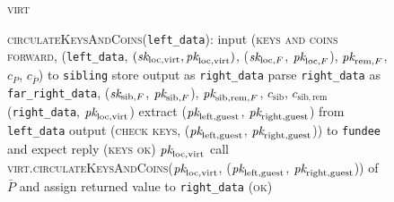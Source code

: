 \begin{figure}[H]
\begin{processbox}{\textsc{virt}}
\begin{algorithmic}[1]
      \State \textsc{circulateKeysAndCoins}(\texttt{left\_data}):
      \Indent
         
           
            \State input (\textsc{keys and coins forward}, (\texttt{left\_data},
            $(\textit{sk}_{\mathrm{loc}, \mathrm{virt}}, \textit{pk}_{\mathrm{loc},
            \mathrm{virt}})$, ($\textit{sk}_{\mathrm{loc}, F}$, $\textit{pk}_{\mathrm{loc}, F}$),
            $\textit{pk}_{\mathrm{rem}, F}$, $c_P$, $c_{\bar{P}}$) to \texttt{sibling}
            \State {}
            \State {}
            \State {}
            \State {}
            \State {}
            \State store output as \texttt{right\_data}
            \State parse \texttt{right\_data} as \texttt{far\_right\_data},
            ($\textit{sk}_{\mathrm{sib}, F}$, $\textit{pk}_{\mathrm{sib}, F}$), $\textit{pk}_{\mathrm{sib},
            \mathrm{rem}, F}$, $c_{\mathrm{sib}}$, $c_{\mathrm{sib},
            \mathrm{rem}}$
            \State \Return (\texttt{right\_data}, $\textit{pk}_{\mathrm{loc},
            \mathrm{virt}}$)
          \Else \: 
            \State extract ($\textit{pk}_{\mathrm{left}, \mathrm{guest}}$,
            $\textit{pk}_{\mathrm{right}, \mathrm{guest}}$) from \texttt{left\_data}
            \State output (\textsc{check keys}, ($\textit{pk}_{\mathrm{left},
            \mathrm{guest}}$, $\textit{pk}_{\mathrm{right}, \mathrm{guest}}$)) to
            \texttt{fundee} and expect reply (\textsc{keys ok})
            \State \Return $\textit{pk}_{\mathrm{loc}, \mathrm{virt}}$
          \EndIf
        \Else \: 
          \State call \textsc{virt.circulateKeysAndCoins}($\textit{pk}_{\mathrm{loc},
          \mathrm{virt}}$, ($\textit{pk}_{\mathrm{left}, \mathrm{guest}}$,
          $\textit{pk}_{\mathrm{right}, \mathrm{guest}}$)) of $\bar{P}$ and assign
          returned value to \texttt{right\_data}
          \State \Return (\textsc{ok})
        \EndIf
      \EndIndent
    \end{algorithmic}
  \end{processbox}
  \caption{}
  \label{code:virtual-layer:keys}
\end{figure}

